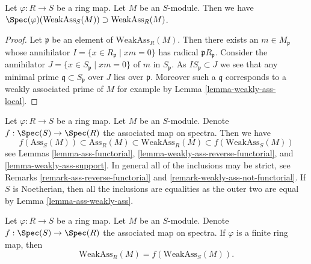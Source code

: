 \begin{lemma}
\label{lemma-weakly-ass-reverse-functorial}
Let $\varphi : R \to S$ be a ring map. Let $M$ be an $S$-module.
Then we have
$\Spec(\varphi)(\text{WeakAss}_S(M)) \supset \text{WeakAss}_R(M)$.
\end{lemma}

\begin{proof}
Let $\mathfrak p$ be an element of $\text{WeakAss}_R(M)$.
Then there exists an $m \in M_{\mathfrak p}$ whose annihilator
$I = \{x \in R_{\mathfrak p} \mid xm = 0\}$ has radical
$\mathfrak pR_{\mathfrak p}$. Consider the annihilator
$J = \{x \in S_{\mathfrak p} \mid xm = 0 \}$ of $m$ in $S_{\mathfrak p}$.
As $IS_{\mathfrak p} \subset J$ we see that any minimal prime
$\mathfrak q \subset S_{\mathfrak p}$ over $J$ lies over $\mathfrak p$.
Moreover such a $\mathfrak q$ corresponds to a weakly associated prime
of $M$ for example by
Lemma \ref{lemma-weakly-ass-local}.
\end{proof}

\begin{remark}
\label{remark-ass-functorial}
Let $\varphi : R \to S$ be a ring map. Let $M$ be an $S$-module.
Denote $f : \Spec(S) \to \Spec(R)$ the associated map on spectra.
Then we have
$$
f(\text{Ass}_S(M)) \subset
\text{Ass}_R(M) \subset
\text{WeakAss}_R(M) \subset
f(\text{WeakAss}_S(M))
$$
see
Lemmas \ref{lemma-ass-functorial},
\ref{lemma-weakly-ass-reverse-functorial}, and
\ref{lemma-weakly-ass-support}.
In general all of the inclusions may be strict, see
Remarks \ref{remark-ass-reverse-functorial} and
\ref{remark-weakly-ass-not-functorial}.
If $S$ is Noetherian, then all the inclusions are equalities as
the outer two are equal by
Lemma \ref{lemma-ass-weakly-ass}.
\end{remark}

\begin{lemma}
\label{lemma-weakly-ass-finite-ring-map}
Let $\varphi : R \to S$ be a ring map. Let $M$ be an $S$-module.
Denote $f : \Spec(S) \to \Spec(R)$ the associated map on spectra.
If $\varphi$ is a finite ring map, then
$$
\text{WeakAss}_R(M) = f(\text{WeakAss}_S(M)).
$$
\end{lemma}

